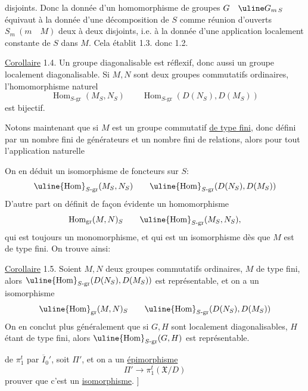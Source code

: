 disjoints. Donc la donnée d'un homomorphisme de groupes
$G\quad\uline G_{m\,S}$
équivaut à la donnée d'une décomposition de $S$ comme réunion d'ouverts
$S_m\ (m\quad M)$ deux à deux disjoints, i.e. à la donnée d'une application
localement constante de $S$ dans $M$. Cela établit 1.3. donc 1.2.

\uline{Corollaire} 1.4. Un groupe diagonalisable est réflexif, donc aussi un
groupe localement diagonalisable. Si $M,N$ sont deux groupes commutatifs
ordinaires,  l'homomorphisme naturel
\[
\operatorname{Hom}_{S\text{-gr}}(M_S,N_S)
\qquad
\operatorname{Hom}_{S\text{-gr}}(D(N_S),D(M_S))
\]
est bijectif.

Notons maintenant que si $M$ est un groupe commutatif \uline{de type fini},
 donc défini par un nombre fini de générateurs et un nombre fini de
relations, alors pour tout
l'application naturelle

On en déduit un isomorphisme de foncteurs sur $S$:
\[
\uline{\operatorname{Hom}}_{S\text{-gr}}(M_S,N_S)
\qquad
\uline{\operatorname{Hom}}_{S\text{-gr}}(D(N_S),D(M_S))
\]
D'autre part on définit de façon évidente un homomorphisme
\[
\operatorname{Hom}_{\mathrm{gr}}(M,N)_S
\qquad
\uline{\operatorname{Hom}}_{S\text{-gr}}(M_S,N_S),
\]
qui est toujours  un monomorphisme, et qui est un isomorphisme dès
que $M$ est de type fini. On trouve ainsi:

\uline{Corollaire} 1.5. 
Soient $M,N$ deux groupes commutatifs
ordinaires, $M$ de type fini, alors 
$\uline{\operatorname{Hom}}_{S\text{-gr}}(D(N_S),D(M_S))$ est
représentable, et on a un isomorphisme
\[
\uline{\operatorname{Hom}}_{\mathrm{gr}}(M,N)_S
\qquad
\uline{\operatorname{Hom}}_{S\text{-gr}}(D(N_S),D(M_S))
\]
On en conclut plus généralement que si $G,H$ sont localement diagonalisables,
$H$ étant de type fini, alors
$\uline{\operatorname{Hom}}_{S\text{-gr}}(G,H)$ est représentable.

de $\pi_1^t$ par $\overline I_0'$, soit
 $\Pi'$, et on a
  un \uline{épimorphisme}
\[
 \Pi'\longrightarrow\pi_1^t(\mathfrak X/D)
\]
prouver que c'est un \uline{isomorphisme}. ]

